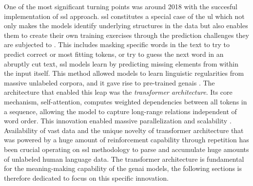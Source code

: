 
One of the most significant turning points was around 2018 with the succesful implementation of \gls{ssl} approach. \Gls{ssl} constitutes a special case of the \gls{ul} which not only makes the models identify underlying structures in the data but also enables them to create their own training exercises through the prediction challenges they are subjected to \parencite[129]{manning2022a}. This includes masking specific words in the text to try to predict correct or most fitting \glspl{token}, or try to guess the next word in an abruptly cut text, \gls{ssl} models learn by predicting missing elements from within the input itself. This method allowed models to learn linguistic regularities from massive unlabeled corpora, and it gave rise to pre-trained \glspl{genai} \parencite{maas2023}. The architecture that enabled this leap was the \textit{transformer architecture}. Its core mechanism, self-attention, computes weighted dependencies between all tokens in a sequence, allowing the model to capture long-range relations independent of word order. This innovation enabled massive parallelization and scalability \parencite{maas2023}. Availability of vast data and the unique novelty of transformer architecture that was powered by a huge amount of reinforcement capability through repetition has been crucial operating on \gls{ssl} methodology to parse and accumulate huge amounts of unlabeled human language data. The transformer architecture is fundamental for the meaning-making capability of the \gls{genai} models, the following sections is therefore dedicated to focus on this specific innovation.







